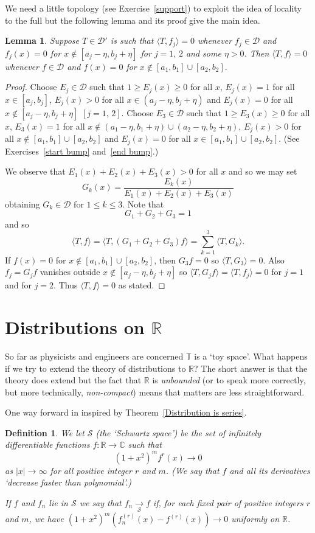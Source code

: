 \documentclass[12pt]{article}
\newtheorem{lemma}[theorem]{Lemma}
\newtheorem{definition}[theorem]{Definition}
\theoremstyle{definition}
\newcommand{\arrowS}{\underset{\mathcal S}{\rightarrow}}
\begin{document}
We need a little topology (see Exercise~\ref{support}) to exploit the idea
of locality to the full but the following lemma and its proof 
give the main idea.
\begin{lemma}\label{start support} Suppose $T\in{\mathcal D}'$
is such that $\langle T,f_{j}\rangle =0$ whenever $f_{j}\in\mathcal D$
and $f_{j}(x)=0$ for $x\notin[a_{j}-\eta,b_{j}+\eta]$
for $j=1,\,2$ and some $\eta>0$.
Then $\langle T,f\rangle =0$ whenever $f\in\mathcal D$
and $f(x)=0$ for $x\notin[a_{1},b_{1}]\cup[a_{2},b_{2}].$ 
\end{lemma}
\begin{proof} Choose $E_{j}\in{\mathcal D}$ such that
$1\geq E_{j}(x)\geq 0$ for all $x$,
$E_{j}(x)=1$ for all $x\in [a_{j},b_{j}]$,
$E_{j}(x)>0$ for all $x\in (a_{j}-\eta,b_{j}+\eta)$
and $E_{j}(x)=0$ for all $x\notin[a_{j}-\eta,b_{j}+\eta]$ $[j=1,\,2]$.
Choose $E_{3}\in{\mathcal D}$ such that
$1\geq E_{3}(x)\geq 0$ for all $x$,
$E_{3}(x)=1$ for all 
$x\notin (a_{1}-\eta,b_{1}+\eta)\cup(a_{2}-\eta,b_{2}+\eta)$,
$E_{j}(x)>0$ for all $x\notin[a_{1},b_{1}]\cup[a_{2},b_{2}]$
and $E_{j}(x)=0$ for all $x\in[a_{1},b_{1}]\cup[a_{2},b_{2}]$.
(See  Exercises~\ref{start bump} and~\ref{end bump}.)

We observe that $E_{1}(x)+E_{2}(x)+E_{3}(x)>0$ for all $x$
and so we may set
\[G_{k}(x)=\frac{E_{k}(x)}{E_{1}(x)+E_{2}(x)+E_{3}(x)}\]
obtaining  $G_{k}\in{\mathcal D}$ for $1\leq k\leq 3$. Note
that
\[G_{1}+G_{2}+G_{3}=1\]
and so
\[\langle T,f\rangle= \langle T,(G_{1}+G_{2}+G_{3})f\rangle
=\sum_{k=1}^{3}\langle T,G_{k}\rangle.\]
If $f(x)=0$ for $x\notin[a_{1},b_{1}]\cup[a_{2},b_{2}]$,
then $G_{3}f=0$ so $\langle T,G_{3}\rangle=0$. Also
$f_{j}=G_{j}f$ vanishes outside $x\notin[a_{j}-\eta,b_{j}+\eta]$
so $\langle T,G_{j}f\rangle=\langle T,f_{j}\rangle=0$
for $j=1$ and for $j=2$. Thus $\langle T,f\rangle=0$
as stated.
\end{proof}
\section{Distributions on ${\mathbb R}$} So far as physicists
and engineers are concerned ${\mathbb T}$ is a `toy space'.
What happens if we try to extend the theory of distributions
to ${\mathbb R}$? The short answer is that the theory does extend
but the fact that ${\mathbb R}$
is \emph{unbounded} (or to speak more correctly,
but more technically, \emph{non-compact}) means that
matters are less straightforward.

One way forward in inspired by Theorem~\ref{Distribution is series}.
\begin{definition} We let ${\mathcal S}$
(the `Schwartz space') be the set of infinitely differentiable
functions $f:{\mathbb R}\rightarrow{\mathbb C}$
such that
\[(1+x^{2})^{m}f^{r}(x)\rightarrow 0\]
as $|x|\rightarrow \infty$ for all positive integer $r$ and $m$.
(We say that $f$ and all its derivatives `decrease
faster than polynomial'.)

If $f$ and $f_{n}$ lie in
${\mathcal S}$ we say that $f_{n}\arrowS f$
if, for each fixed pair of positive integers $r$ and $m$, 
we have $(1+x^{2})^{m}(f_{n}^{(r)}(x)-f^{(r)}(x))\rightarrow 0$
uniformly on ${\mathbb R}$.
\end{definition}
\end{document}
